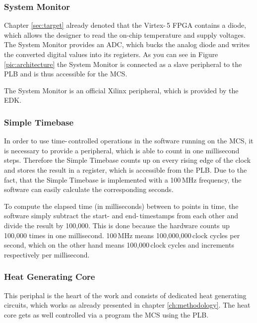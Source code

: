 \subsubsection{System Monitor}

Chapter \ref{sec:target} already denoted that the Virtex-\,5 \ac{FPGA} contains a diode, which allows the designer to read the on-chip temperature and supply voltages. The System Monitor provides an \ac{ADC}, which bucks the analog diode and writes the converted digital values into its registers. As you can see in Figure \ref{pic:architecture} the System Monitor is connected as a slave peripheral to the \ac{PLB} and is thus accessible for the \ac{MCS}.

The System Monitor is an official Xilinx peripheral, which is provided by the \ac{EDK}.

\subsubsection{Simple Timebase}

In order to use time-\,controlled operations in the software running on the \ac{MCS}, it is necessary to provide a peripheral, which is able to count in one millisecond steps. Therefore the Simple Timebase counts up on every rising edge of the clock and stores the result in a register, which is accessible from the \ac{PLB}.  Due to the fact, that the Simple Timebase is implemented with a 100\,MHz frequency, the software can easily calculate the corresponding seconds. 

To compute the elapsed time (in milliseconds) between to points in time, the software simply subtract the start- and end-\,timestamps from each other and divide the result by 100,000. This is done because the hardware counts up 100,000 times in one millisecond. 100\,MHz means 100,000,000\,clock cycles per second, which on the other hand means 100,000\,clock cycles and increments respectively per millisecond. 

\subsubsection{Heat Generating Core}

This periphal is the heart of the work and consists of dedicated heat generating circuits, which works as already presented in chapter \ref{ch:methodology}. The heat core gets as well controlled via a program the \ac{MCS} using the \ac{PLB}.